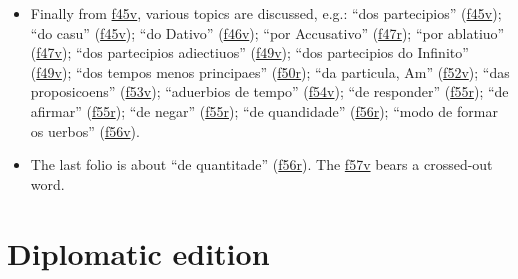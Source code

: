 \documentclass[12pt,a4paper]{scrbook}
\begin{document}
\begin{itemize}
\item Finally from \hyperlink{img-100}{f45v}, various topics are discussed, e.g.: “dos partecipios” (\hyperlink{img-100}{f45v}); “do casu” (\hyperlink{img-100}{f45v}); “do Dativo” (\hyperlink{img-102}{f46v}); “por Accusativo” (\hyperlink{img-103}{f47r}); “por ablatiuo” (\hyperlink{img-104}{f47v}); “dos partecipios adiectiuos” (\hyperlink{img-108}{f49v}); “dos partecipios do Infinito” (\hyperlink{img-108}{f49v}); “dos tempos menos principaes” (\hyperlink{img-109}{f50r}); “da particula, Am” (\hyperlink{img-114}{f52v}); “das proposicoens” (\hyperlink{img-116}{f53v}); “aduerbios de tempo” (\hyperlink{img-118}{f54v}); “de responder” (\hyperlink{img-119}{f55r}); “de afirmar” (\hyperlink{img-119}{f55r}); “de negar” (\hyperlink{img-119}{f55r}); “de quandidade” (\hyperlink{img-121}{f56r}); “modo de formar os uerbos” (\hyperlink{img-122}{f56v}).
    
\item The last folio is about “de quantitade” (\hyperlink{img-121}{f56r}). The \hyperlink{img-123}{f57v} bears a crossed-out word.
    
\end{itemize}
    
                    
            
\cleardoublepage
\makeatletter\@openrightfalse
\part{Diplomatic edition}
    
    
      
\end{document}
